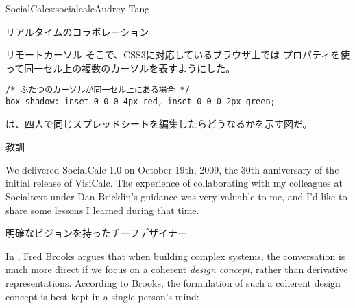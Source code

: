 \begin{aosachapter}{SocialCalc}{s:socialcalc}{Audrey Tang}
\begin{aosasect1}{リアルタイムのコラボレーション}
\begin{aosasect2}{リモートカーソル}
そこで、CSS3に対応しているブラウザ上では
プロパティを使って同一セル上の複数のカーソルを表すようにした。

\begin{verbatim}
/* ふたつのカーソルが同一セル上にある場合 */
box-shadow: inset 0 0 0 4px red, inset 0 0 0 2px green;
\end{verbatim}

は、四人で同じスプレッドシートを編集したらどうなるかを示す図だ。


\end{aosasect2}

\end{aosasect1}

\begin{aosasect1}{教訓}

We delivered SocialCalc 1.0 on October 19th, 2009, the 30th
anniversary of the initial release of VisiCalc.  The experience of
collaborating with my colleagues at Socialtext under Dan Bricklin's
guidance was very valuable to me, and I'd like to share some lessons
I learned during that time.

\begin{aosasect2}{明確なビジョンを持ったチーフデザイナー}

In \cite{bib:brooks:design}, Fred Brooks argues that when building
complex systems, the conversation is much more direct if we focus on a
coherent \emph{design concept}, rather than derivative
representations. According to Brooks, the formulation of such a
coherent design concept is best kept in a single person's mind:

\begin{quotation}


\end{quotation}
\end{aosasect2}
\end{aosasect1}
\end{aosachapter}
